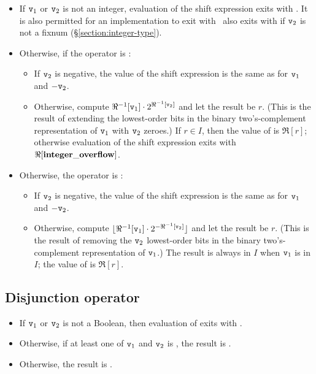 \begin{itemize}
\item If ${\tt{\sl v}}_1$ or ${\tt{\sl v}}_2$ is not an integer, evaluation of
the shift expression exits with \T{\badarith}.
\ifStd It is also permitted for an implementation to exit with
 \fi
\ifOld \OldErlang\ also exits with  \fi
if ${\tt{\sl v}}_2$ is not a fixnum (\S\ref{section:integer-type}).
\item Otherwise, if the operator is :
\begin{itemize}
\item If ${\tt{\sl v}}_2$ is negative, the value of the shift expression is
the same as  for ${\tt{\sl v}}_1$ and $-{\tt{\sl v}}_2$.
\item Otherwise, compute $\Re^{-1}[{\tt{\sl v}}_1]\cdot2^{\Re^{-1}[{\tt{\sl v}}_2]}$ and let
the result be $r$.  (This is the result of extending the lowest-order
bits in the binary two's-complement representation of ${\tt{\sl v}}_1$ with
${\tt{\sl v}}_2$ zeroes.)  If $r\in I$, then the value of  is $\Re[r]$; otherwise evaluation of the shift expression
exits with $\Re[{\bf integer\_overflow}]$.
\end{itemize}
\item Otherwise, the operator is :
\begin{itemize}
\item If ${\tt{\sl v}}_2$ is negative, the value of the shift expression is
the same as  for ${\tt{\sl v}}_1$ and $-{\tt{\sl v}}_2$.
\item Otherwise, compute
$\lfloor\Re^{-1}[{\tt{\sl v}}_1]\cdot2^{-\Re^{-1}[{\tt{\sl v}}_2]}\rfloor$ and let the
result be $r$.  (This is the result of removing the ${\tt{\sl v}}_2$
lowest-order bits in the binary two's-complement representation of
${\tt{\sl v}}_1$.)  The result is always in $I$ when ${\tt{\sl v}}_1$ is in $I$;
the value of  is $\Re[r]$.
\end{itemize}
\end{itemize}

\subsection{Disjunction operator }

\label{section:booleanor}

\begin{itemize}
\item If ${\tt{\sl v}}_1$ or ${\tt{\sl v}}_2$ is not a Boolean, then
      evaluation of  exits with
      \ifStd{}\else{}\fi.
\item Otherwise, if at least one of ${\tt{\sl v}}_1$ and ${\tt{\sl v}}_2$ is ,
      the result is .
\item Otherwise, the result is .
\end{itemize}

